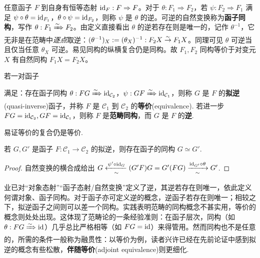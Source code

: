 任意函子 $F$ 到自身有恒等态射 $\mathrm{id}_F : F \Rightarrow F$。对于 $\theta: F_1 \Rightarrow F_2$，若 $\psi: F_2 \Rightarrow F_1$ 满足 $\psi \circ \theta = \mathrm{id}_{F_1}$，$\theta \circ \psi = \mathrm{id}_{F_2}$，则称 $\psi$ 是 $\theta$ 的逆。可逆的自然变换称为\textbf{函子同构}，写作 $\theta: F_1 \xRightarrow{\sim} F_2$。由定义直接看出 $\theta$ 的逆若存在则是唯一的，记作 $\theta^{-1}$，它无非是在范畴中\textit{逐点}取逆：$(\theta^{-1})_X := (\theta_X)^{-1}: F_2 X \stackrel{\sim}{\rightarrow} F_1 X$。同理可见 $\theta$ 可逆当且仅当任意 $\theta_X$ 可逆。易见同构的纵横复合仍是同构。故 $F_1,F_2$ 同构等价于对变元 $X$ 有自然同构 $F_1 X= F_2 X$。

\begin{definition}\label{def:cat-equivalence}
	若一对函子
	满足：存在函子同构 $\theta: FG \xRightarrow{\sim} \mathrm{id}_{\mathcal{C}_2}$，$\psi: GF \xRightarrow{\sim} \mathrm{id}_{\mathcal{C}_1}$，则称 $G$ 是 $F$ 的\textbf{拟逆}(quasi-inverse)函子，并称 $F$ 是 $\mathcal{C}_1$ 到 $\mathcal{C}_2$ 的\textbf{等价}(equivalence).
	若进一步 $FG = \mathrm{id}_{\mathcal{C}_2}, GF = \mathrm{id}_{\mathcal{C}_1}$，则称 $F$ 是\textbf{范畴同构}，而 $G$ 是 $F$ 的\textbf{逆}.
\end{definition}
易证等价的复合仍是等价.

\begin{proposition}
	若 $G, G'$ 是函子 $F: \mathcal{C}_1 \to \mathcal{C}_2$ 的拟逆，则存在函子的同构 $G \simeq G'$.
\end{proposition}
\begin{proof}
	自然变换的横合成给出 $G \xleftarrow[\sim]{\psi' \circ \mathrm{id}_G} (G'F)G = G'(FG) \xrightarrow[\sim]{\mathrm{id}_{G'} \circ \theta} G'$.
\end{proof}

\begin{remark}
	业已对“对象态射”“函子态射/自然变换”定义了逆，其逆若存在则唯一，依此定义何谓对象、函子同构。对于函子亦可定义逆的概念，逆函子若存在则唯一；相较之下，拟逆函子之间则可以差一个同构。实践表明范畴的同构概念不甚实用，等价的概念则处处出现。这体现了范畴论的一条经验准则：在函子层次，同构（如 $\theta: FG \xRightarrow{\sim} \mathrm{id}$）几乎总比严格相等（如 $FG = \mathrm{id}$）来得管用。然而同构也不是任意的，所需的条件一般称为融贯性：以等价为例，读者兴许已经在先前论证中感到拟逆的概念有些松散，\textbf{伴随等价}(adjoint equivalence)则更细化.
\end{remark}

